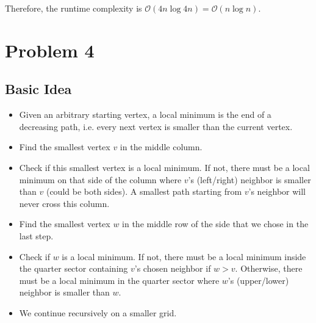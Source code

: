 \documentclass[12pt]{article}
\begin{document}
Therefore, the runtime complexity is $\mathcal{O}(4n \log 4n) = \mathcal{O}(n \log n)$.





\section*{Problem 4}
\subsection*{Basic Idea}
\begin{itemize}
	\item Given an arbitrary starting vertex, a local minimum is the end of a decreasing path, i.e. every next vertex is smaller than the current vertex.
	\item Find the smallest vertex $v$ in the middle column.
	\item Check if this smallest vertex is a local minimum. If not, there must be a local minimum on that side of the column  where $v$'s (left/right) neighbor is smaller than $v$ (could be both sides). A smallest path starting from $v$'s neighbor will never cross this column.
	\item Find the smallest vertex $w$ in the middle row of the side that we chose in the last step.
	\item Check if $w$ is a local minimum. If not, there must be a local minimum inside the quarter sector containing $v$'s chosen neighbor if $w > v$. Otherwise, there must be a local minimum in the quarter sector where $w$'s (upper/lower) neighbor is smaller than $w$.
	\item We continue recursively on a smaller grid.
\end{itemize}
\end{document}
